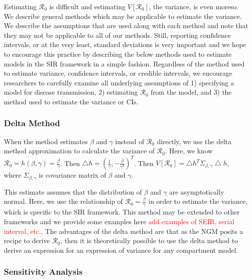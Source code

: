 \documentclass[12pt]{article}
\newcommand{\com}[1]{\textcolor{red}{ #1}}
\newcommand{\rr}{\ensuremath{\mathcal{R}_0}}
\begin{document}
Estimating $\rr$ is difficult and estimating $V[\rr]$, the variance, is even moreso.  We describe general methods which may be applicable to estimate the variance.  We describe the assumptions that are used along with each method and note that they may not be applicable to all of our methods.  Still, reporting confidence intervals, or at the very least, standard deviations is very important and we hope to encourage this practice by describing the below methods used to estimate models in the SIR framework in a simple fashion.  Regardless of the method used to estimate variance, confidence intervals, or credible intervals, we encourage researchers to carefully examine all underlying assumptions of 1) specifying a model for disease transmission, 2) estimating $\rr$ from the model, and 3) the method used to estimate the variance or CIs.


\subsubsection{Delta Method}\label{delta-method}

When the method estimates \(\beta\) and \(\gamma\) instead of \(\rr\) directly, we use the delta method approximation to calculate the
variance of \(\rr\). Here, we know \(\rr = h(\beta, \gamma) = \frac{\beta}{\gamma}\). Then \(\bigtriangleup h = (\frac{1}{\gamma},  -\frac{\beta}{\gamma^2})^T\).  Then \(V[\rr] = \bigtriangleup h^T \Sigma_{\beta, \gamma} \bigtriangleup h\), where \(\Sigma_{\beta, \gamma}\) is covariance matrix of \(\beta\) and \(\gamma\).

This estimate assumes that the distribution of $\beta$ and $\gamma$ are asymptotically normal.  Here, we use the relationship of $\rr = \frac{\beta}{\gamma}$ in order to estimate the variance, which is specific to the SIR framework.  This method may be extended to other frameworks and we provide some examples here \com{add examples of SEIR, serial interval, etc.}.  The advantages of the delta method are that as the NGM posits a recipe to derive $\rr$, then it is theoretically possible to use the delta method to derive an expression for an expression of variance for any compartment model.

\subsubsection{Sensitivity Analysis}\label{sensitivity-analysis}
\end{document}
